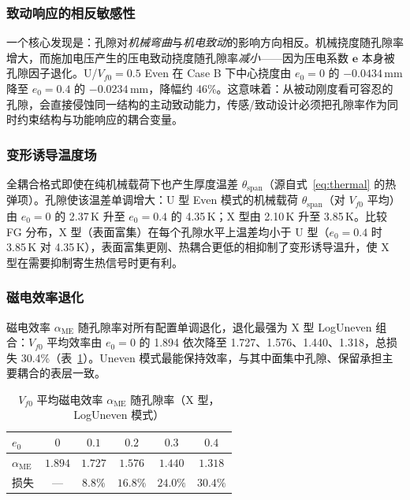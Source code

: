\documentclass[11pt,a4paper]{ctexart}
\begin{document}
\subsubsection{致动响应的相反敏感性}

一个核心发现是：孔隙对\emph{机械弯曲}与\emph{机电致动}的影响方向相反。机械挠度随孔隙率增大，而施加电压产生的压电致动挠度随孔隙率\emph{减小}——因为压电系数 $\bm{e}$ 本身被孔隙因子退化。U/$V_{f0}=0.5$ Even 在 Case B 下中心挠度由 $e_0=0$ 的 $-0.0434$\,mm 降至 $e_0=0.4$ 的 $-0.0234$\,mm，降幅约 46\%。这意味着：从被动刚度看可容忍的孔隙，会直接侵蚀同一结构的主动致动能力，传感/致动设计必须把孔隙率作为同时约束结构与功能响应的耦合变量。

\subsubsection{变形诱导温度场}

全耦合格式即使在纯机械载荷下也产生厚度温差 $\theta_{\text{span}}$（源自式~\eqref{eq:thermal} 的热弹项）。孔隙使该温差单调增大：U 型 Even 模式的机械载荷 $\theta_{\text{span}}$（对 $V_{f0}$ 平均）由 $e_0=0$ 的 2.37\,K 升至 $e_0=0.4$ 的 4.35\,K；X 型由 2.10\,K 升至 3.85\,K。比较 FG 分布，X 型（表面富集）在每个孔隙水平上温差均小于 U 型（$e_0=0.4$ 时 3.85\,K 对 4.35\,K），表面富集更刚、热耦合更低的相抑制了变形诱导温升，使 X 型在需要抑制寄生热信号时更有利。

\subsubsection{磁电效率退化}

磁电效率 $\alpha_{\text{ME}}$ 随孔隙率对所有配置单调退化，退化最强为 X 型 LogUneven 组合：$V_{f0}$ 平均效率由 $e_0=0$ 的 1.894 依次降至 1.727、1.576、1.440、1.318，总损失 30.4\%（表~\ref{tab:me-eff-porous}）。Uneven 模式最能保持效率，与其中面集中孔隙、保留承担主要耦合的表层一致。

\begin{table}[H]
\centering
\caption{$V_{f0}$ 平均磁电效率 $\alpha_{\text{ME}}$ 随孔隙率（X 型，LogUneven 模式）}
\label{tab:me-eff-porous}
\begin{tabular}{lccccc}
\toprule
$e_0$ & $0$ & $0.1$ & $0.2$ & $0.3$ & $0.4$ \\
\midrule
$\alpha_{\text{ME}}$ & $1.894$ & $1.727$ & $1.576$ & $1.440$ & $1.318$ \\
损失 & --- & $8.8\%$ & $16.8\%$ & $24.0\%$ & $30.4\%$ \\
\bottomrule
\end{tabular}
\end{table}
\end{document}
